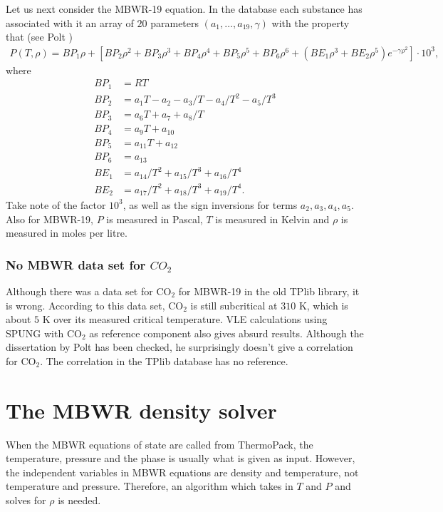 \documentclass[internal,english]{sintefmemo2012}
\numberwithin{equation}{section}
\begin{document}
Let us next consider the MBWR-19 equation. In the database each
substance has associated with it an array of $20$ parameters
$(a_1,\ldots,a_{19},\gamma)$ with the property that (see Polt \cite{Polt87})
\begin{align*}
  P(T,\rho) = BP_1 \rho + \left[ BP_2 \rho^2 + BP_3 \rho^3 + BP_4
    \rho^4 + BP_5 \rho^5 + BP_6 \rho^6 + (BE_1\rho^3 + BE_2 \rho^5)
    e^{-\gamma \rho^2} \right] \cdot 10^3,
\end{align*}
where
\begin{equation}
  \label{eq:BPBE_MBWR19}
  \begin{aligned}
    BP_1 &= RT \\
    BP_2 &= a_1T-a_2-a_3/T-a_4/T^2-a_5/T^3 \\
    BP_3 &= a_6T+a_7+a_8/T \\
    BP_4 &= a_9T+a_{10} \\
    BP_5 &= a_{11}T+a_{12} \\
    BP_6 &= a_{13} \\
    BE_1 &= a_{14}/T^2+a_{15}/T^3+a_{16}/T^4 \\
    BE_2 &= a_{17}/T^2+a_{18}/T^3+a_{19}/T^4.
  \end{aligned}
\end{equation}
Take note of the factor $10^3$, as well as the sign inversions for
terms $a_2,a_3,a_4,a_5$. Also for MBWR-19, $P$ is measured in Pascal, $T$ is
measured in Kelvin and $\rho$ is measured in moles per litre.

\subsubsection*{No MBWR data set for $CO_2$}
Although there was a data set for $\mathrm{CO}_2$ for MBWR-19 in the old TPlib
library, it is wrong. According to this data set, $\mathrm{CO_2}$ is still
subcritical at $310$ K, which is about $5$ K over its measured critical
temperature. VLE calculations using SPUNG with $\mathrm{CO}_2$ as reference
component also gives absurd results. Although the dissertation by Polt \cite{Polt87}
has been checked, he surprisingly doesn't give a correlation for
$\mathrm{CO}_2$. The correlation in the TPlib database has no reference.

\section{The MBWR density solver} \label{sec:density}
When the MBWR equations of state are called from ThermoPack, the
temperature, pressure and the phase is usually what
is given as input. However, the independent variables in MBWR
equations are density and temperature, not temperature and
pressure. Therefore, an algorithm which takes in $T$ and $P$ and
solves for $\rho$ is needed.
\end{document}
